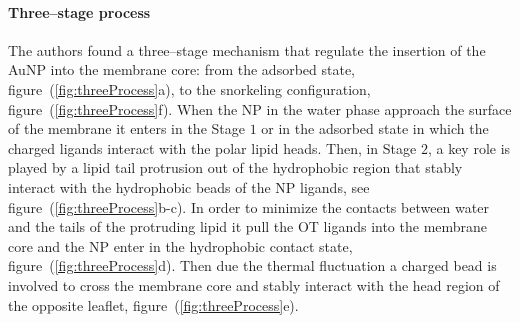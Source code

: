 \paragraph{\textbf{Three--stage process}} The authors found a three--stage mechanism that regulate the insertion of the \ac{AuNP} into the membrane core: from the adsorbed state, figure~(\ref{fig:threeProcess}a), to the snorkeling configuration, figure~(\ref{fig:threeProcess}f). When the \ac{NP} in the water phase approach the surface of the membrane it enters in the Stage $1$ or in the adsorbed state in which the charged ligands interact with the polar lipid heads. Then, in Stage $2$, a key role is played by a lipid tail protrusion out of the hydrophobic region that stably interact with the hydrophobic beads of the \ac{NP} ligands, see figure~(\ref{fig:threeProcess}b-c). In order to minimize the contacts between water and the tails of the protruding lipid it pull the \ac{OT} ligands into the membrane core and the \ac{NP} enter in the hydrophobic contact state, figure~(\ref{fig:threeProcess}d). Then due the thermal fluctuation a charged bead is involved to cross the membrane core and stably interact with the head region of the opposite leaflet, figure~(\ref{fig:threeProcess}e).
